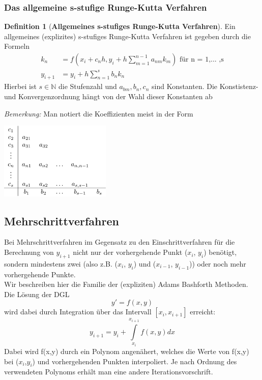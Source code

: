 \documentclass{article}
\newenvironment{Figure}
	{\par\medskip\noindent\minipage{\linewidth}}
	{\endminipage\par\medskip}
\theoremstyle{satz}
\theoremstyle{definition}
\newtheorem{definition}{Definition}
\begin{document}
\subsubsection{Das allgemeine s-stufige Runge-Kutta Verfahren}
\begin{tcolorbox}
\begin{definition}[\textbf{Allgemeines s-stufiges Runge-Kutta Verfahren}]
Ein allgemeines (explizites) s-stufiges Runge-Kutta Verfahren ist gegeben durch die Formeln
\begin{equation}
\begin{split}
k_n &= f(x_i + c_n h, y_i + h \sum\limits_{m=1}^{n-1} a_{nm}k_{m}) \textrm{ für n = 1,... ,s}\\
y_{i+1} &= y_i + h \sum\limits_{n=1}^{s} b_n k_n 
\end{split}
\end{equation}
Hierbei ist $s \in \mathbb{N}$ die Stufenzahl und $a_{bm}, b_n, c_n$ sind Konstanten. Die Konstistenz- und Konvergenzordnung hängt von der Wahl dieser Konstanten ab
\end{definition}
\end{tcolorbox}
\textit{Bemerkung: } Man notiert die Koeffizienten meist in der Form
\begin{Figure}
\centering
\includegraphics[width=200px]{img/KoeffizientenForm.png}
	\label{fig:Koeffizienten Formen}
\end{Figure}

\subsection{Mehrschrittverfahren}
Bei Mehrschrittverfahren im Gegensatz zu den Einschrittverfahren für die Berechnung von $y_{i+1}$ nicht nur der vorhergehende Punkt ($x_i$, $y_i$) benötigt, sondern mindestens zwei (also z.B. ($x_i$, $y_i$) und ($x_{i−1}$, $y_{i−1}$)) oder noch mehr vorhergehende Punkte.\\
Wir beschreiben hier die Familie der (expliziten) Adams Bashforth Methoden.\\
Die Lösung der DGL
\begin{equation}
y' = f(x,y)
\end{equation}
wird dabei durch Integration über das Intervall $[x_i, x_{i+1}]$ erreicht:
\begin{equation}
y_{i+1} = y_i + \int\limits_{x_i}^{x_{i+1}} f(x,y)dx
\end{equation}
Dabei wird f(x,y) durch ein Polynom angenähert, welches die Werte von f(x,y) bei ($x_i$,$y_i$) und vorhergehenden Punkten interpoliert. Je nach Ordnung des verwendeten Polynoms erhält man eine andere Iterationsvorschrift.
\end{document}
